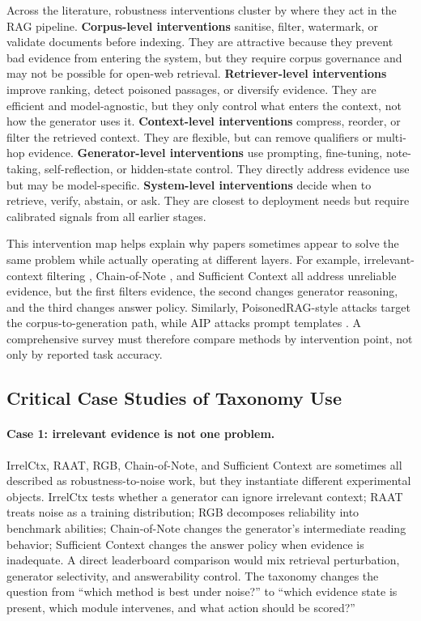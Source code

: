 Across the literature, robustness interventions cluster by where they act in the RAG pipeline. \textbf{Corpus-level interventions} sanitise, filter, watermark, or validate documents before indexing. They are attractive because they prevent bad evidence from entering the system, but they require corpus governance and may not be possible for open-web retrieval. \textbf{Retriever-level interventions} improve ranking, detect poisoned passages, or diversify evidence. They are efficient and model-agnostic, but they only control what enters the context, not how the generator uses it. \textbf{Context-level interventions} compress, reorder, or filter the retrieved context. They are flexible, but can remove qualifiers or multi-hop evidence. \textbf{Generator-level interventions} use prompting, fine-tuning, note-taking, self-reflection, or hidden-state control. They directly address evidence use but may be model-specific. \textbf{System-level interventions} decide when to retrieve, verify, abstain, or ask. They are closest to deployment needs but require calibrated signals from all earlier stages.

This intervention map helps explain why papers sometimes appear to solve the same problem while actually operating at different layers. For example, irrelevant-context filtering \citep{irrelevantContext2023}, Chain-of-Note \citep{chainOfNote2023}, and Sufficient Context \citep{sufficientContext2024} all address unreliable evidence, but the first filters evidence, the second changes generator reasoning, and the third changes answer policy. Similarly, PoisonedRAG-style attacks \citep{poisonedRAG2024} target the corpus-to-generation path, while AIP attacks prompt templates \citep{aip2025}. A comprehensive survey must therefore compare methods by intervention point, not only by reported task accuracy.

\subsection{Critical Case Studies of Taxonomy Use}


\paragraph{Case 1: irrelevant evidence is not one problem.}
IrrelCtx, RAAT, RGB, Chain-of-Note, and Sufficient Context are sometimes all described as robustness-to-noise work, but they instantiate different experimental objects. IrrelCtx tests whether a generator can ignore irrelevant context; RAAT treats noise as a training distribution; RGB decomposes reliability into benchmark abilities; Chain-of-Note changes the generator's intermediate reading behavior; Sufficient Context changes the answer policy when evidence is inadequate. A direct leaderboard comparison would mix retrieval perturbation, generator selectivity, and answerability control. The taxonomy changes the question from ``which method is best under noise?'' to ``which evidence state is present, which module intervenes, and what action should be scored?''

